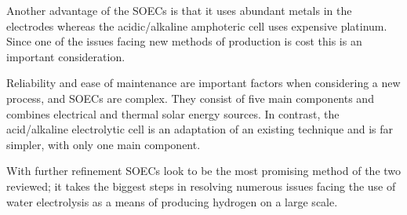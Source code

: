 Another advantage of the SOECs is that it uses abundant metals in the electrodes whereas the acidic/alkaline amphoteric cell uses expensive platinum.
Since one of the issues facing new methods of  production is cost this is an important consideration.

Reliability and ease of maintenance are important factors when considering a new process, and SOECs are complex.
They consist of five main components and combines electrical and thermal solar energy sources.
In contrast, the acid/alkaline electrolytic cell is an adaptation of an existing technique and is far simpler, with only one main component.

With further refinement SOECs look to be the most promising method of the two reviewed; it takes the biggest steps in resolving numerous issues facing the use of water electrolysis as a means of producing hydrogen on a large scale.

